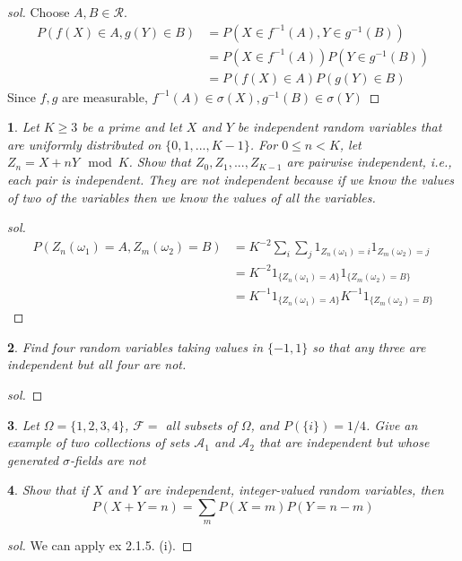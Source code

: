 \documentclass{report}
\newtheorem{ex}{}[section]
\begin{document}
\begin{proof}[sol]
Choose $A,B \in \mathcal{R}$.
\begin{align*}
    P(f(X)\in A, g(Y)\in B) &= P(X\in f^{-1}(A), Y \in g^{-1}(B))\\
    &= P(X\in f^{-1}(A))P(Y \in g^{-1}(B))\\
    &= P(f(X)\in A)P(g(Y) \in B)
\end{align*}
Since $f,g$ are measurable, $f^{-1}(A) \in \sigma(X), g^{-1}(B) \in \sigma(Y)$
\end{proof}
\begin{ex}
Let $K \ge 3$ be a prime and let $X$ and $Y$ be independent random variables that are uniformly distributed on $\{0, 1, . . . ,K-1\}$. For $0 \le n < K$, let $Z_n = X + nY \mod K$. Show that $Z_0,Z_1, ...,Z_{K-1}$ are pairwise independent, i.e., each pair is independent. They are not independent because if we know the values of two of the variables then we know the values of all the variables.
\end{ex}
\begin{proof}[sol]
\begin{align*}
    P(Z_n(\omega_1) = A, Z_m(\omega_2) = B) &= K^{-2}\sum_i\sum_j 1_{Z_n(\omega_1) = i}1_{Z_m(\omega_2) = j}\\
    &= K^{-2}1_{\{Z_n(\omega_1) = A\}}1_{\{Z_m(\omega_2) = B\}}\\
    &= K^{-1}1_{\{Z_n(\omega_1) = A\}}K^{-1}1_{\{Z_m(\omega_2) = B\}}
\end{align*}
\end{proof}
\begin{ex}
Find four random variables taking values in $\{-1, 1\}$ so that any three are independent but all four are not.
\end{ex}
\begin{proof}[sol]
\end{proof}
\begin{ex}
Let $\Omega = \{1,2,3,4\}$, $\mathcal{F} = $ all subsets of $\Omega$, and $P(\{i\}) = 1/4$. Give an example of two collections of sets $\mathcal{A}_1$ and $\mathcal{A}_2$ that are independent but whose generated $\sigma$-fields are not 
\end{ex}
\begin{ex}
Show that if $X$ and $Y$ are independent, integer-valued random variables, then
\[P(X + Y = n) = \sum_m P(X = m)P(Y = n-m)\]
\end{ex}
\begin{proof}[sol]
We can apply ex 2.1.5. (i).
\end{proof}
\end{document}
